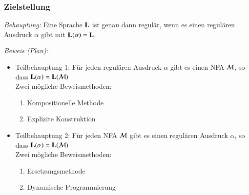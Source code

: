\documentclass[onlymath]{beamer}
\begin{document}

\begin{frame}\frametitle{Zielstellung}

\emph{Behauptung:} Eine Sprache $\textbf{\textcolor{black}{L}}$ ist genau dann regulär, wenn es einen regulären
Ausdruck $\alpha$ gibt mit $\textbf{\textcolor{black}{L}}(\alpha)=\textbf{\textcolor{black}{L}}$.
\medskip

\emph{Beweis (Plan):} 
\begin{itemize}
\item Teilbehauptung 1: \alert{Für jeden regulären Ausdruck $\alpha$ gibt es einen NFA $\mathcal{M}$, so dass  $\textbf{\textcolor{black}{L}}(\alpha)=\textbf{\textcolor{black}{L}}(\mathcal{M})$}\\[1ex]
Zwei mögliche Beweismethoden:
\begin{enumerate}[(1)]
\item Kompositionelle Methode
\item Explizite Konstruktion
\end{enumerate}
\item Teilbehauptung 2: \alert{Für jeden NFA $\mathcal{M}$ gibt es einen regulären Ausdruck $\alpha$, so dass  $\textbf{\textcolor{black}{L}}(\alpha)=\textbf{\textcolor{black}{L}}(\mathcal{M})$}\\[1ex]
Zwei mögliche Beweismethoden:
\begin{enumerate}[(1)]
\item Ersetzungsmethode
\item Dynamische Programmierung
\end{enumerate}
\end{itemize}

\end{frame}
\end{document}

